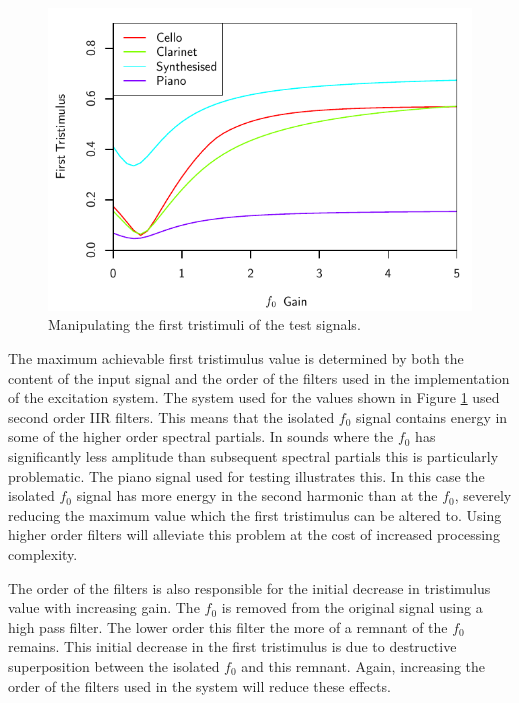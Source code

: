 		\begin{figure}[h!]
			\centering
			\includegraphics{chapter6/Images/MoveTristimulus1.pdf}
			\caption{Manipulating the first tristimuli of the test signals.}
			\label{fig:MoveTristimulus1}
		\end{figure}

		The maximum achievable first tristimulus value is determined by both the content of the input signal and
		the order of the filters used in the implementation of the excitation system. The system used for the
		values shown in Figure \ref{fig:MoveTristimulus1} used second order IIR filters. This means that the
		isolated $f_{0}$ signal contains energy in some of the higher order spectral partials. In sounds where the
		$f_{0}$ has significantly less amplitude than subsequent spectral partials this is particularly
		problematic. The piano signal used for testing illustrates this. In this case the isolated $f_{0}$ signal
		has more energy in the second harmonic than at the $f_{0}$, severely reducing the maximum value which the
		first tristimulus can be altered to.  Using higher order filters will alleviate this problem at the cost of
		increased processing complexity.

		The order of the filters is also responsible for the initial decrease in tristimulus value with increasing
		gain. The $f_{0}$ is removed from the original signal using a high pass filter. The lower order this filter
		the more of a remnant of the $f_{0}$ remains. This initial decrease in the first tristimulus is due to
		destructive superposition between the isolated $f_{0}$ and this remnant. Again, increasing the order of the
		filters used in the system will reduce these effects.

